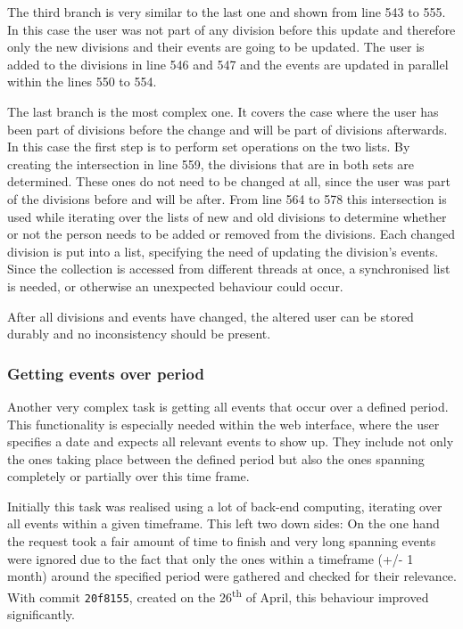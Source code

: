The third branch is very similar to the last one and shown from line 543 to 555. In this case the user was not part of any division before this update and therefore only the new divisions and their events are going to be updated. The user is added to the divisions in line 546 and 547 and the events are updated in parallel within the lines 550 to 554. 

The last branch is the most complex one. It covers the case where the user has been part of divisions before the change and will be part of divisions afterwards. In this case the first step is to perform set operations on the two lists. By creating the intersection in line 559, the divisions that are in both sets are determined. These ones do not need to be changed at all, since the user was part of the divisions before and will be after. From line 564 to 578 this intersection is used while iterating over the lists of new and old divisions to determine whether or not the person needs to be added or removed from the divisions. Each changed division is put into a list, specifying the need of updating the division's events. Since the collection is accessed from different threads at once, a synchronised list is needed, or otherwise an unexpected behaviour could occur.

After all divisions and events have changed, the altered user can be stored durably and no inconsistency should be present.

\subsubsection{Getting events over period}

Another very complex task is getting all events that occur over a defined period. This functionality is especially needed within the web interface, where the user specifies a date and expects all relevant events to show up. They include not only the ones taking place between the defined period but also the ones spanning completely or partially over this time frame.

Initially this task was realised using a lot of back-end computing, iterating over all events within a given timeframe. This left two down sides: On the one hand the request took a fair amount of time to finish and very long spanning events were ignored due to the fact that only the ones within a timeframe (+/- 1 month) around the specified period were gathered and checked for their relevance. With commit \texttt{20f8155}, created on the 26\textsuperscript{th} of April, this behaviour improved significantly.

